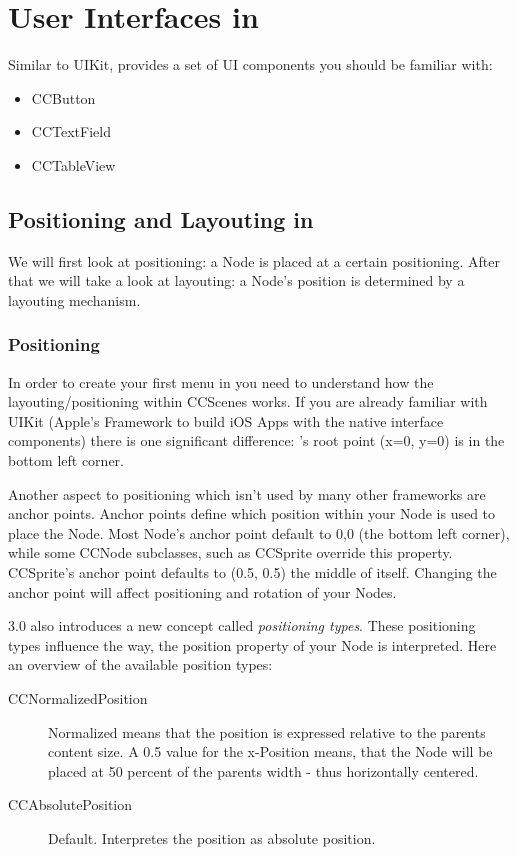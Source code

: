 \chapter{User Interfaces in \cocos{}}
Similar to UIKit, \cocos{} provides a set of UI components you should be
familiar with:
\begin{itemize}
  \item CCButton
  \item CCTextField
  \item CCTableView
\end{itemize}

\section{Positioning and Layouting in \cocos{}}
We will first look at positioning: a Node is placed at a certain positioning.
After that we will take a look at layouting: a Node's position is determined by
a layouting mechanism.
\subsection{Positioning}
In order to create your first menu in \cocos{} you need to understand how the
layouting/positioning within CCScenes works. If you are already
familiar with UIKit (Apple's Framework to build iOS Apps with the native
interface components) there is one significant difference: \cocos{}'s root point
(x=0, y=0) is in the bottom left corner.

Another aspect to positioning which isn't used by many other frameworks
are anchor points. Anchor points define which position within your Node is used
to place the Node. Most Node's anchor point default to 0,0 (the bottom left
corner), while some CCNode subclasses, such as CCSprite override this property.
CCSprite's anchor point defaults to (0.5, 0.5) the middle of itself.
Changing the anchor point will affect positioning and rotation of your Nodes.

\cocos{} 3.0 also introduces a new concept called \textit{positioning types}.
These positioning types influence the way, the position property of your Node is
interpreted. Here an overview of the available position types:

\begin{description}
  \item[CCNormalizedPosition] Normalized means that the position is expressed
  relative to the parents content size. A 0.5 value for the x-Position means,
  that the Node will be placed at 50 percent of the parents width - thus
  horizontally centered.
  \item[CCAbsolutePosition] Default. Interpretes the position as absolute
  position.
\end{description}

